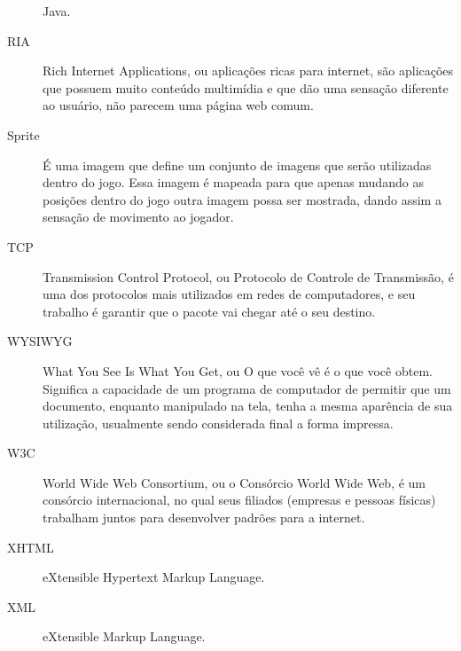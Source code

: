 \begin{description}
Java.
\item[RIA ] Rich Internet Applications, ou aplicações ricas para
internet, são aplicações que possuem muito conteúdo multimídia e que
dão uma sensação diferente ao usuário, não parecem uma página web
comum.
\item[Sprite ] É uma imagem que define um conjunto de imagens que
serão utilizadas dentro do jogo. Essa imagem é mapeada para que apenas
mudando as posições dentro do jogo outra imagem possa ser mostrada,
dando assim a sensação de movimento ao jogador.
\item[TCP ] Transmission Control Protocol, ou Protocolo de Controle de
Transmissão, é uma dos protocolos mais utilizados em redes de
computadores, e seu trabalho é garantir que o pacote vai chegar até o
seu destino.
\item[WYSIWYG ] What You See Is What You Get, ou O que você vê é o que
você obtem. Significa a capacidade de um programa de computador de
permitir que um documento, enquanto manipulado na tela, tenha a mesma
aparência de sua utilização, usualmente sendo considerada final a
forma impressa.
\item[W3C ] World Wide Web Consortium, ou o Consórcio World Wide Web,
é um consórcio internacional, no qual seus filiados (empresas e
pessoas físicas) trabalham juntos para desenvolver padrões para a
internet.
\item[XHTML ] eXtensible Hypertext Markup Language.
\item[XML ] eXtensible Markup Language.

\end{description}
\newpage

